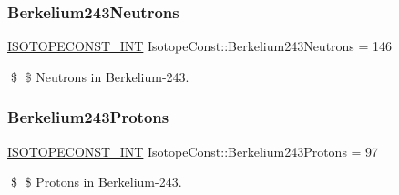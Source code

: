 \subsubsection{\texorpdfstring{Berkelium243\+Neutrons}{Berkelium243Neutrons}}
{\footnotesize\ttfamily \mbox{\hyperlink{group___isotope_const-_macros_ga5f18360b3e99483a35c32d789e62621c}{I\+S\+O\+T\+O\+P\+E\+C\+O\+N\+S\+T\+\_\+\+I\+NT}} Isotope\+Const\+::\+Berkelium243\+Neutrons = 146}

\$ \$ Neutrons in Berkelium-\/243. \mbox{\label{group___isotope_const-_berkelium-_bk243_ga81771c56005736af613b620d75fef6fe}} 
\subsubsection{\texorpdfstring{Berkelium243\+Protons}{Berkelium243Protons}}
{\footnotesize\ttfamily \mbox{\hyperlink{group___isotope_const-_macros_ga5f18360b3e99483a35c32d789e62621c}{I\+S\+O\+T\+O\+P\+E\+C\+O\+N\+S\+T\+\_\+\+I\+NT}} Isotope\+Const\+::\+Berkelium243\+Protons = 97}

\$ \$ Protons in Berkelium-\/243. 